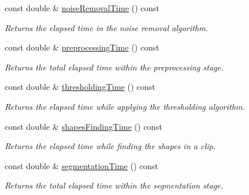 \begin{CompactItemize}
const double \& \hyperlink{class_statistics_ba44f1b2567a77f99ee15c11bda6312a}{noiseRemovalTime} () const 
\begin{CompactList}\small\item\em Returns the elapsed time in the noise removal algorithm. \item\end{CompactList}\item 
const double \& \hyperlink{class_statistics_9b1c2d1f1338069346c80293a2c11b6d}{preprocessingTime} () const 
\begin{CompactList}\small\item\em Returns the total elapsed time within the preprocessing stage. \item\end{CompactList}\item 
const double \& \hyperlink{class_statistics_51a8c70011a201873db8f388dad733ac}{thresholdingTime} () const 
\begin{CompactList}\small\item\em Returns the elapsed time while applying the thresholding algorithm. \item\end{CompactList}\item 
const double \& \hyperlink{class_statistics_9437fbc6726c6179b3ee4c130520e642}{shapesFindingTime} () const 
\begin{CompactList}\small\item\em Returns the elapsed time while finding the shapes in a clip. \item\end{CompactList}\item 
const double \& \hyperlink{class_statistics_f4c992e9970bce97b9a33100db689739}{segmentationTime} () const 
\begin{CompactList}\small\item\em Returns the total elapsed time within the segmentation stage. \item\end{CompactList}\end{CompactItemize}
